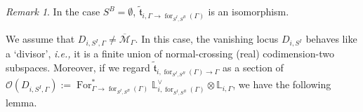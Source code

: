 \documentclass[11pt]{amsart}
\theoremstyle{definition}
\theoremstyle{remark}
\newtheorem{rmk}[dummy]{Remark}
\renewcommand{\for}{\operatorname{for}}
\newcommand{\For}{\operatorname{For}}
\newcommand{\<}{\left<}
\renewcommand{\>}{\right>}
\numberwithin{equation}{section}
\def\Mbar{{\overline{\mathcal M}}}
\begin{document}
\begin{rmk}\label{rmk forget boundry point}
In the case $S^B=\emptyset$,  $\tilde{\mathfrak t}_{i,\Gamma \to \for_{{S^I,S^B}}(\Gamma)}$ is an isomorphism.
\end{rmk}
 We assume that %
$D_{i,S^I,\Gamma}\ne \Mbar_{\Gamma}$. In this %
case, the vanishing locus %
$D_{i,S^I}$ behaves like %
a `divisor', \textit{i.e.,} %
it is a finite union of normal-crossing (real) codimension-two subspaces. Moreover, if we regard $\tilde{\mathfrak t}_{i,\for_{{S^I,S^B}}(\Gamma)\to \Gamma}$ as a section of $\mathcal O(D_{i,S^I,\Gamma}):=\For_{\Gamma \to \for_{{S^I,S^B}}(\Gamma)}^* \mathbb L_{i,\for_{{S^I,S^B}}(\Gamma)}^\vee \otimes \mathbb L_{i,\Gamma}$, we have the following lemma.
 
\end{document}
